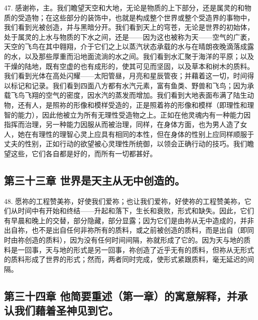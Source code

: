 47. 感谢祢，主。我们瞻望天空和大地，无论是物质的上下部分，还是属灵的和物质的受造物；在这些部分的装饰中，也就是构成整个世界或整个受造界的事物中，我们看到光被创造，并与黑暗分开。我们看到天上的穹苍，无论是世界的初始体，处于属灵的上水与物质的下水之间，还是——因为这也被称为天——空气的广袤，天空的飞鸟在其中翱翔，介于它们之上以蒸汽状态承载的水与在晴朗夜晚滴落成露的水，以及那些厚重而沿地面流淌的水之间。我们看到水汇聚于海洋的平原；以及干燥的陆地，既有空虚的也有成形的，使其可见而坚固，以及草本和树木的质料。我们看到光体在高处闪耀——太阳管昼，月亮和星辰管夜；并藉着这一切，时间得以标记和记录。我们看到四面八方都有水汽元素，富有鱼类、野兽和飞鸟；因为承载飞鸟飞翔的空气的密度，因水汽的蒸发而增加。我们看到大地表面布满了陆生动物，还有人，是照祢的形像和模样受造的，正是照着祢的形像和模样（即理性和理智的能力），因此他被立为所有无理性受造物之上。正如在他灵魂内有一种能力因指挥而治理，另一种能力因服从而被治理，同样，在身体方面，也为男人造了女人，她在有理性的理智心灵上应具有相同的本性，但在身体的性别上应同样顺服于丈夫的性别，正如行动的欲望被心灵理性所统御，以领会正确行动的技巧。我们瞻望这些，它们各自都是好的，而所有一切都甚好。\par


\subsection{第三十三章 世界是天主从无中创造的。}

48. 愿祢的工程赞美祢，好使我们爱祢；也让我们爱祢，好使祢的工程赞美祢，它们从时间中有开始和终结——升起和落下，生长和衰败，形式和缺失。因此，它们有早晨和晚上的交替，部分隐藏，部分显露；因为它们是由祢从无中造成的，并非出自祢，也不是出自任何非祢所有的质料，或之前被创造的质料，而是出自（即同时由祢创造的质料），因为没有任何时间间隔，祢就形成了它的。因为天与地的质料是一回事，天与地的形式是另一回事，祢创造了近乎无有的质料，但祢从无形式的质料形成了世界的形式；然而，两者同时完成，使形式紧跟质料，毫无延迟的间隔。\par


\subsection{第三十四章 他简要重述（第一章）的寓意解释，并承认我们藉着圣神见到它。}

